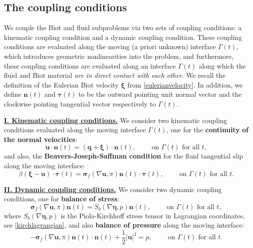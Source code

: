 \documentclass[11pt]{article}
\newcommand{\bd}{\boldsymbol}
\theoremstyle{definition}
\begin{document}
\subsection{The coupling conditions}

We couple the Biot and fluid subproblems via two sets of coupling conditions: a kinematic coupling condition and a dynamic coupling condition. These coupling conditions are evaluated along the moving (a priori unknown) interface $\Gamma(t)$, which introduces geometric nonlinearities into the problem, and furthermore, these coupling conditions are evaluated along an interface $\Gamma(t)$ along which the fluid and Biot material \textit{are in direct contact with each other}. We recall the definition of the Eulerian Biot velocity $\bd{\xi}$ from \eqref{eulerianvelocity}. In addition, we define $\bd{n}(t)$ and $\bd{\tau}(t)$ to be the outward pointing unit normal vector and the clockwise pointing tangential vector respectively to $\Gamma(t)$. 

\medskip

\noindent \underline{\textbf{I. Kinematic coupling conditions.}} We consider two kinematic coupling conditions evaluated along the moving interface $\Gamma(t)$, one for the \textbf{continuity of the normal velocities}:
\begin{equation}\label{kin1}
\bd{u} \cdot \bd{n}(t) = (\bd{q} + \bd{\xi}) \cdot \bd{n}(t), \qquad \text{ on } \Gamma(t) \text{ for all } t,
\end{equation}
and also, the \textbf{Beavers-Joseph-Saffman condition} for the fluid tangential slip along the moving interface:
\begin{equation}\label{kin2}
\beta (\bd{\xi} - \bd{u}) \cdot \bd{\tau}(t) = \bd{\sigma}_{f}(\nabla \bd{u}, \pi) \bd{n}(t) \cdot \bd{\tau}(t), \qquad \text{ on } \Gamma(t) \text{ for all } t.
\end{equation}

\bigskip

\noindent \underline{\textbf{II. Dynamic coupling conditions.}} We consider two dynamic coupling conditions, one for \textbf{balance of stress}:
\begin{equation}\label{normalstress}
\bd{\sigma}_{f}(\nabla \bd{u}, \pi) \bd{n}(t)  = S_{b}(\nabla \bd{\eta}, p) \bd{n}(t), \qquad \text{ on } \Gamma(t) \text{ for all } t,
\end{equation}
where $S_{b}(\nabla \bd{\eta}, p)$ is the Piola-Kirchhoff stress tensor in Lagrangian coordinates, see \eqref{kirchlagrangian}, and also \textbf{balance of pressure} along the moving interface:
\begin{equation}\label{dyn2}
-\bd{\sigma}_{f}(\nabla \bd{u}, \pi) \bd{n}(t) \cdot \bd{n}(t) + \frac{1}{2}|\bd{u}|^{2} = p, \qquad \text{ on } \Gamma(t) \text{ for all } t.
\end{equation}
\end{document}
